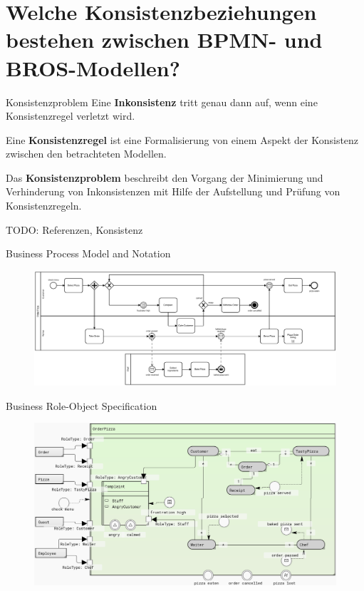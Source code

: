 \section{Welche Konsistenzbeziehungen bestehen zwischen BPMN- und BROS-Modellen?}

\begin{frame}{Konsistenzproblem}
  Eine \textbf{Inkonsistenz} tritt genau dann auf, wenn eine Konsistenzregel verletzt wird.

  Eine \textbf{Konsistenzregel} ist eine Formalisierung von einem Aspekt der Konsistenz zwischen den betrachteten Modellen.

  Das \textbf{Konsistenzproblem} beschreibt den Vorgang der Minimierung und Verhinderung von Inkonsistenzen mit Hilfe der Aufstellung und Prüfung von Konsistenzregeln.

  TODO: Referenzen, Konsistenz
\end{frame}

\begin{frame}{Business Process Model and Notation}
  \begin{figure}
    \centering
    \begin{adjustbox}{width=1.1\linewidth,center}
      \includegraphics{images/example/bpmn.pdf}
    \end{adjustbox}
  \end{figure}
\end{frame}
\begin{frame}{Business Role-Object Specification}
  \begin{figure}
    \centering
    \begin{adjustbox}{width=0.9\linewidth,center}
      \includegraphics{images/example/bros-rule6.png}
    \end{adjustbox}
  \end{figure}
\end{frame}

